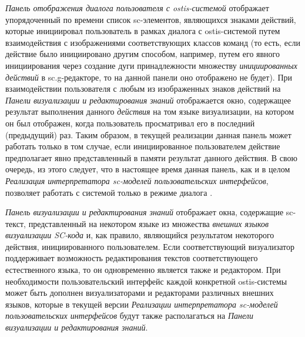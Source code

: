 \textit{Панель отображения диалога пользователя с ostis-системой} отображает упорядоченный по времени список sc-элементов,
являющихся знаками действий, которые инициировал пользователь в рамках диалога с ostis-системой путем взаимодействия
с изображениями соответствующих классов команд (то есть, если действие было инициировано другим способом, например,
путем его явного инициирования через создание дуги принадлежности множеству \textit{инициированных действий} в
sc.g-редакторе, то на данной панели оно отображено не будет). При взаимодействии пользователя с любым из изображенных
знаков действий на \textit{Панели визуализации и редактирования знаний} отображается окно, содержащее результат выполнения
данного \textit{действия} на том языке визуализации, на котором он был отображен, когда пользователь просматривал его в
последний (предыдущий) раз. Таким образом, в текущей реализации данная панель может работать только в том случае, если
инициированное пользователем действие предполагает явно представленный в памяти результат данного действия. В свою очередь,
из этого следует, что в настоящее время данная панель, как и в целом \textit{Реализация интерпретатора sc-моделей
пользовательских интерфейсов}, позволяет работать с системой только в режиме диалога .

\textit{Панель визуализации и редактирования знаний} отображает окна, содержащие sc-текст, представленный на
некотором языке из множества \textit{внешних языков визуализации SC-кода} и, как правило, являющийся результатом
некоторого действия, инициированного пользователем. Если соответствующий визуализатор поддерживает возможность
редактирования текстов соответствующего естественного языка, то он одновременно является также и редактором.
При необходимости пользовательский интерфейс каждой конкретной ostis-системы может быть дополнен визуализаторами и
редакторами различных внешних языков, которые в текущей версии \textit{Реализации интерпретатора sc-моделей
пользовательских интерфейсов} будут также располагаться на \textit{Панели визуализации и редактирования знаний}.

%